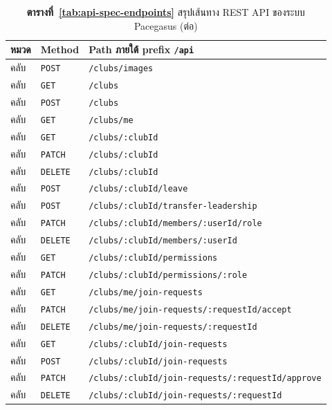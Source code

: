 \begin{table}[H]
\centering
\captionsetup{justification=centering,singlelinecheck=true}
\setlength{\tabcolsep}{3pt}
\renewcommand{\arraystretch}{1.08}
\caption*{\textbf{ตารางที่~\ref{tab:api-spec-endpoints}} สรุปเส้นทาง REST API ของระบบ Pacegasus (ต่อ)}
\begin{tabular}{|>{\raggedright\arraybackslash\normalsize}p{}|>{\raggedright\arraybackslash\normalsize}p{}|>{\raggedright\arraybackslash\fontsize{9.25}{11.5}\selectfont}p{}|}
\hline
\textbf{หมวด} & \textbf{Method} & \textbf{Path ภายใต้ prefix \texttt{/api}} \\ \hline
คลับ & \texttt{POST} & \texttt{/clubs/images} \\
คลับ & \texttt{GET} & \texttt{/clubs} \\
คลับ & \texttt{POST} & \texttt{/clubs} \\
คลับ & \texttt{GET} & \texttt{/clubs/me} \\
คลับ & \texttt{GET} & \texttt{/clubs/:clubId} \\
คลับ & \texttt{PATCH} & \texttt{/clubs/:clubId} \\
คลับ & \texttt{DELETE} & \texttt{/clubs/:clubId} \\
คลับ & \texttt{POST} & \texttt{/clubs/:clubId/leave} \\
คลับ & \texttt{POST} & \texttt{/clubs/:clubId/transfer-leadership} \\
คลับ & \texttt{PATCH} & \texttt{/clubs/:clubId/members/:userId/role} \\
คลับ & \texttt{DELETE} & \texttt{/clubs/:clubId/members/:userId} \\
คลับ & \texttt{GET} & \texttt{/clubs/:clubId/permissions} \\
คลับ & \texttt{PATCH} & \texttt{/clubs/:clubId/permissions/:role} \\
คลับ & \texttt{GET} & \texttt{/clubs/me/join-requests} \\
คลับ & \texttt{PATCH} & \texttt{/clubs/me/join-requests/:requestId/accept} \\
คลับ & \texttt{DELETE} & \texttt{/clubs/me/join-requests/:requestId} \\
คลับ & \texttt{GET} & \texttt{/clubs/:clubId/join-requests} \\
คลับ & \texttt{POST} & \texttt{/clubs/:clubId/join-requests} \\
คลับ & \texttt{PATCH} & \texttt{/clubs/:clubId/join-requests/:requestId/approve} \\
คลับ & \texttt{DELETE} & \texttt{/clubs/:clubId/join-requests/:requestId} \\

\end{tabular}
\end{table}
